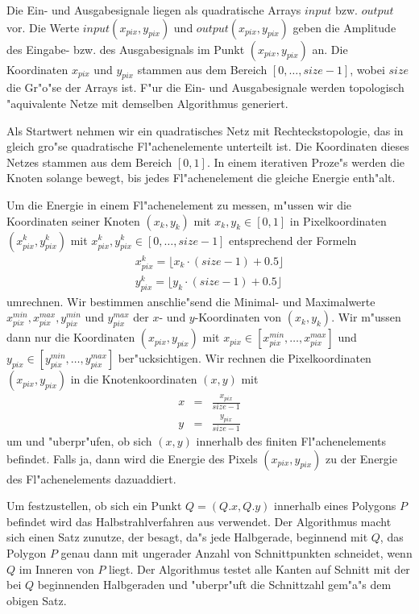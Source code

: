 \documentclass[11pt,a4paper]{article}
\begin{document}
    Die Ein- und Ausgabesignale liegen als quadratische Arrays $input$ bzw. $output$ vor. Die Werte
    $input(x_{pix}, y_{pix})$ und $output(x_{pix}, y_{pix})$ geben die Amplitude des 
    Eingabe- bzw. des Ausgabesignals im Punkt $(x_{pix},y_{pix})$ an. Die Koordinaten $x_{pix}$ und $y_{pix}$
    stammen aus dem Bereich $\left[0,\ldots, size-1\right]$, wobei $size$ die Gr"o"se der Arrays ist. 
    F"ur die Ein- und Ausgabesignale werden topologisch "aquivalente Netze mit demselben Algorithmus generiert. 
    
    Als Startwert nehmen wir ein quadratisches Netz mit Rechteckstopologie, das in gleich gro"se quadratische 
    Fl"achenelemente unterteilt ist. Die Koordinaten dieses Netzes stammen aus dem Bereich 
    $\left[0,1\right]$. In einem iterativen Proze"s werden die Knoten solange bewegt, bis jedes 
    Fl"achenelement die gleiche Energie enth"alt.

    Um die Energie in einem Fl"achenelement zu messen, m"ussen wir die Koordinaten seiner Knoten 
    $(x_k,y_k)$ mit $x_k,y_k \in \left[0, 1\right]$ in Pixelkoordinaten $(x^{k}_{pix},y^{k}_{pix})$ mit 
    $x^k_{pix}, y^k_{pix} \in \left[0,\ldots,size-1\right]$ entsprechend der Formeln
    \begin{eqnarray}
      x^{k}_{pix} = \lfloor x_k \cdot (size-1) + 0.5 \rfloor\\
      y^{k}_{pix} = \lfloor y_k \cdot (size-1) + 0.5 \rfloor
    \end{eqnarray}  
    umrechnen. Wir bestimmen anschlie"send die Minimal- und Maximalwerte $x^{min}_{pix}, x^{max}_{pix}, y^{min}_{pix}$ 
    und $ y^{max}_{pix}$ der $x$- und $y$-Koordinaten von $(x_k,y_k)$. Wir m"ussen dann nur die
    Koordinaten $(x_{pix},y_{pix})$ mit $x_{pix}\in [ x^{min}_{pix},\ldots,x^{max}_{pix} ]$
    und $y_{pix}\in [ y^{min}_{pix},\ldots,y^{max}_{pix} ]$ ber"ucksichtigen. Wir rechnen die Pixelkoordinaten 
    $(x_{pix},y_{pix})$ in die Knotenkoordinaten $(x,y)$ mit 
    \begin{eqnarray}
      x & = & \frac{x_{pix}}{size-1} \\
      y & = & \frac{y_{pix}}{size-1}
    \end{eqnarray} 
    um und "uberpr"ufen, ob sich $(x,y)$ innerhalb des finiten Fl"achenelements befindet. 
    Falls ja, dann wird die Energie des Pixels $(x_{pix},y_{pix})$ zu der Energie des Fl"achenelements dazuaddiert.

    Um festzustellen, ob sich ein Punkt $Q=(Q.x, Q.y)$ innerhalb eines Polygons $P$ befindet wird das 
    Halbstrahlverfahren aus \cite{schmidt}
    verwendet. Der Algorithmus macht sich einen Satz zunutze, der besagt, da"s jede Halbgerade, beginnend mit $Q$, 
    das Polygon $P$ genau dann mit ungerader Anzahl von Schnittpunkten schneidet, wenn $Q$ im Inneren von $P$ liegt. 
    Der Algorithmus testet alle Kanten
    auf Schnitt mit der bei $Q$ beginnenden Halbgeraden und "uberpr"uft die Schnittzahl gem"a"s dem obigen Satz.
\end{document}
